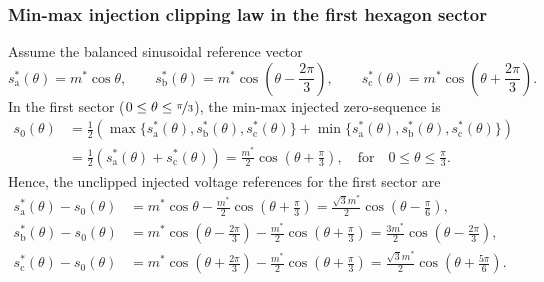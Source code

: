 \begin{frame}
    \frametitle{Min-max injection clipping law in the first hexagon sector}
    Assume the balanced sinusoidal reference vector
    \begin{equation}
        s_\mathrm{a}^*(\theta)=m^*\cos\theta, \qquad
        s_\mathrm{b}^*(\theta)=m^*\cos\!\left(\theta-\frac{2\pi}{3}\right), \qquad
        s_\mathrm{c}^*(\theta)=m^*\cos\!\left(\theta+\frac{2\pi}{3}\right).
        \label{eq:balanced_sinusoidal_reference_PWM}
    \end{equation}\pause
    In the first sector ($0 \le \theta \le \nicefrac{\pi}{3}$), the min-max injected zero-sequence is
    \begin{equation}
        \begin{split}
            s_0(\theta) & = \frac{1}{2}\left(\max\{s_\mathrm{a}^*(\theta), s_\mathrm{b}^*(\theta), s_\mathrm{c}^*(\theta)\} + \min\{s_\mathrm{a}^*(\theta), s_\mathrm{b}^*(\theta), s_\mathrm{c}^*(\theta)\}\right) \\
                        & = \frac{1}{2}\left(s_\mathrm{a}^*(\theta) + s_\mathrm{c}^*(\theta)\right)= \frac{m^*}{2}\cos\!\left(\theta+\frac{\pi}{3}\right), \quad \text{for} \quad 0 \le \theta \le \frac{\pi}{3}.
        \end{split}
    \end{equation}\pause
    Hence, the unclipped injected voltage references for the first sector are
    \begin{equation}
        \begin{split}
            s_\mathrm{a}^*(\theta) - s_0(\theta) & = m^*\cos\theta - \frac{m^*}{2}\cos\!\left(\theta+\frac{\pi}{3}\right) = \frac{\sqrt{3}m^*}{2}\cos\!\left(\theta-\frac{\pi}{6}\right),                                \\
            s_\mathrm{b}^*(\theta) - s_0(\theta) & = m^*\cos\!\left(\theta-\frac{2\pi}{3}\right) - \frac{m^*}{2}\cos\!\left(\theta+\frac{\pi}{3}\right) = \frac{3m^*}{2}\cos\!\left(\theta-\frac{2\pi}{3}\right),        \\
            s_\mathrm{c}^*(\theta) - s_0(\theta) & = m^*\cos\!\left(\theta+\frac{2\pi}{3}\right) - \frac{m^*}{2}\cos\!\left(\theta+\frac{\pi}{3}\right) = \frac{\sqrt{3}m^*}{2}\cos\!\left(\theta+\frac{5\pi}{6}\right).
        \end{split}
        \label{eq:unclipped_ref_overmod_min_max}
    \end{equation}
\end{frame}

